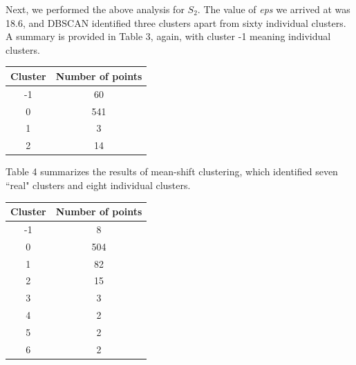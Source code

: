 \documentclass[12pt,a4paper,twocolumn]{article}
\begin{document}
Next, we performed the above analysis for $S_2$. The value of \textit{eps} we arrived at was 18.6, and DBSCAN identified three clusters apart from sixty individual clusters. A summary is provided in Table 3, again, with cluster -1 meaning individual clusters.\\

\begin{tabular}{|c|c|}
\hline 
\textbf{Cluster} & \textbf{Number of points} \\ 
\hline 
-1 & 60 \\ 
\hline 
0 & 541 \\ 
\hline 
1 & 3 \\ 
\hline 
2 & 14 \\ 
\hline 
\end{tabular} 
\begingroup
{}
\endgroup
\hfill\break

Table 4 summarizes the results of mean-shift clustering, which identified seven ``real" clusters and eight individual clusters.\\

\begin{tabular}{|c|c|}
\hline 
\textbf{Cluster} & \textbf{Number of points} \\ 
\hline 
-1 & 8 \\ 
\hline 
0 & 504 \\ 
\hline 
1 & 82 \\ 
\hline 
2 & 15 \\ 
\hline 
3 & 3 \\ 
\hline 
4 & 2 \\ 
\hline 
5 & 2 \\ 
\hline 
6 & 2 \\ 
\hline 
\end{tabular} 
\begingroup
{}
\endgroup
\hfill\break
\end{document}
